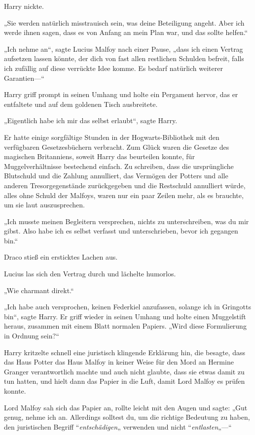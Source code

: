 {Harry nickte.

„Sie werden natürlich misstrauisch sein, was deine Beteiligung angeht. Aber ich werde ihnen sagen, dass es von Anfang an mein Plan war, und das sollte helfen.“

„Ich nehme an“, sagte Lucius Malfoy nach einer Pause, „dass ich einen Vertrag aufsetzen lassen könnte, der dich von fast allen restlichen Schulden befreit, falls ich zufällig auf diese verrückte Idee komme. Es bedarf natürlich weiterer Garantien—“

Harry griff prompt in seinen Umhang und holte ein Pergament hervor, das er entfaltete und auf dem goldenen Tisch ausbreitete.

„Eigentlich habe ich mir das selbst erlaubt“, sagte Harry.

Er hatte einige sorgfältige Stunden in der Hogwarts-Bibliothek mit den verfügbaren Gesetzesbüchern verbracht. Zum Glück waren die Gesetze des magischen Britanniens, soweit Harry das beurteilen konnte, für Muggelverhältnisse bestechend einfach. Zu schreiben, dass die ursprüngliche Blutschuld und die Zahlung annulliert, das Vermögen der Potters und alle anderen Tresorgegenstände zurückgegeben und die Restschuld annulliert würde, alles ohne Schuld der Malfoys, waren nur ein paar Zeilen mehr, als es brauchte, um sie laut auszusprechen.

„Ich musste meinen Begleitern versprechen, nichts zu unterschreiben, was du mir gibst. Also habe ich es selbst verfasst und unterschrieben, bevor ich gegangen bin.“

Draco stieß ein ersticktes Lachen aus.

Lucius las sich den Vertrag durch und lächelte humorlos.

„Wie charmant direkt.“

„Ich habe auch versprochen, keinen Federkiel anzufassen, solange ich in Gringotts bin“, sagte Harry. Er griff wieder in seinen Umhang und holte einen Muggelstift heraus, zusammen mit einem Blatt normalen Papiers. „Wird diese Formulierung in Ordnung sein?“

Harry kritzelte schnell eine juristisch klingende Erklärung hin, die besagte, dass das Haus Potter das Haus Malfoy in keiner Weise für den Mord an Hermine Granger verantwortlich machte und auch nicht glaubte, dass sie etwas damit zu tun hatten, und hielt dann das Papier in die Luft, damit Lord Malfoy es prüfen konnte.

Lord Malfoy sah sich das Papier an, rollte leicht mit den Augen und sagte: „Gut genug, nehme ich an. Allerdings solltest du, um die richtige Bedeutung zu haben, den juristischen Begriff “\emph{entschädigen}„ verwenden und nicht “\emph{entlasten}„—“

}
